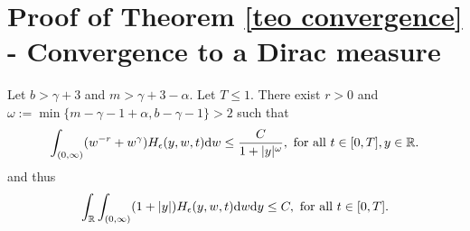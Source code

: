\documentclass[11pt]{article}
\numberwithin{equation}{section}
\newcommand{\der}{\textup{d}}
\begin{document}
\section{Proof of Theorem \ref{teo convergence} - Convergence to a Dirac measure}
\begin{prop}
    Let $b>\gamma+3$ and $m>\gamma+3-\alpha$. Let $T\leq 1$. There exist $r>0$ and $\omega:=\min\{m-\gamma-1+\alpha,b-\gamma-1\}>2$ such that
\begin{align}\label{integral in y}
    \int_{(0,\infty)}(w^{-r}+w^{\gamma})H_{\epsilon}(y,w,t)\der w\leq \frac{C}{1+|y|^{\omega}}, \textup{ for all } t\in[0,T], y\in\mathbb{R}.
\end{align}and thus 
    \begin{align}\label{integral large y}
    \int_{\mathbb{R}}\int_{(0,\infty)}(1+|y|)H_{\epsilon}(y,w,t)\der w\der y\leq C, \textup{ for all } t\in[0,T].
\end{align}
\end{prop}
\end{document}

